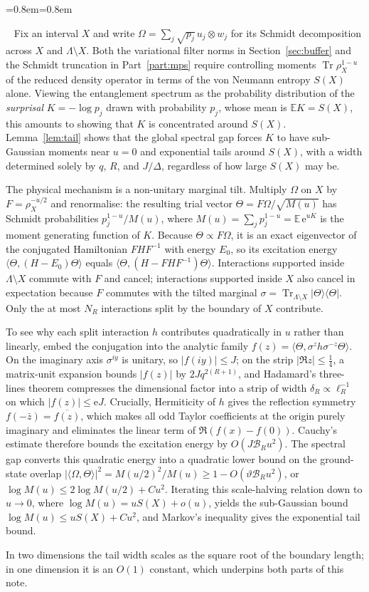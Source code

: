 \documentclass[aps,prx,reprint,superscriptaddress,floatfix,nofootinbib,longbibliography,amsmath,amssymb]{revtex4-2}
\newcommand{\E}{\mathbb E}
\newcommand{\Tr}{\operatorname{Tr}}
\newcommand{\abs}[1]{\lvert #1\rvert}
\providecommand{\ket}[1]{|#1\rangle}\renewcommand{\ket}[1]{|#1\rangle}
\providecommand{\bra}[1]{\langle #1|}\renewcommand{\bra}[1]{\langle #1|}
\newcommand{\cB}{\mathcal B}
\newcommand{\Om}{\Omega}
\newcommand{\Lam}{\Lambda}
\newcommand{\e}{\mathrm e}
\theoremstyle{plain}
\theoremstyle{definition}
\newenvironment{inwords}{%
  \par\medskip\noindent
  \begin{list}{}{\leftmargin=0.8em\rightmargin=0.8em}
  \item\relax
  \noindent{\sffamily\bfseries\color{blue!40!black}In words.}\ \sffamily\small}{%
  \end{list}\par\medskip}
\begin{document}
\begin{inwords}
Fix an interval $X$ and write $\Om=\sum_j\sqrt{p_j}\,u_j\otimes w_j$ for
its Schmidt decomposition across $X$ and $\Lam\setminus X$. Both the
variational filter norms in Section~\ref{sec:buffer} and the Schmidt
truncation in Part~\ref{part:mps} require controlling moments
$\Tr\rho_X^{1-u}$ of the reduced density operator in terms of the von
Neumann entropy $S(X)$ alone. Viewing the entanglement spectrum as the
probability distribution of the \emph{surprisal} $K=-\log p_j$ drawn with
probability $p_j$, whose mean is $\E K=S(X)$, this amounts to showing that
$K$ is concentrated around $S(X)$. Lemma~\ref{lem:tail} shows that the
global spectral gap forces $K$ to have sub-Gaussian moments near $u=0$ and
exponential tails around $S(X)$, with a width determined solely by $q$,
$R$, and $J/\Delta$, regardless of how large $S(X)$ may be.

The physical mechanism is a non-unitary marginal tilt. Multiply $\Om$ on
$X$ by $F=\rho_X^{-u/2}$ and renormalise: the resulting trial vector
$\Theta=F\Om/\sqrt{M(u)}$ has Schmidt probabilities $p_j^{1-u}/M(u)$, where
$M(u)=\sum_jp_j^{1-u}=\E\,\e^{uK}$ is the moment generating function of
$K$. Because $\Theta\propto F\Om$, it is an exact eigenvector of the
conjugated Hamiltonian $FHF^{-1}$ with energy $E_0$, so its excitation
energy $\langle\Theta,(H-E_0)\Theta\rangle$ equals
$\langle\Theta,(H-FHF^{-1})\Theta\rangle$. Interactions supported inside
$\Lam\setminus X$ commute with $F$ and cancel; interactions supported
inside $X$ also cancel in expectation because $F$ commutes with the tilted
marginal $\sigma=\Tr_{\Lam\setminus X}\ket\Theta\bra\Theta$. Only the at
most $N_R$ interactions split by the boundary of $X$ contribute.

To see why each split interaction $h$ contributes quadratically in $u$
rather than linearly, embed the conjugation into the analytic family
$f(z)=\langle\Theta,\sigma^{z}h\sigma^{-z}\Theta\rangle$. On the imaginary
axis $\sigma^{iy}$ is unitary, so $\abs{f(iy)}\le J$; on the strip
$\abs{\Re z}\le\frac14$, a matrix-unit expansion bounds $\abs{f(z)}$ by
$2Jq^{2(R+1)}$, and Hadamard's three-lines theorem compresses the
dimensional factor into a strip of width $\delta_R\propto\ell_R^{-1}$ on
which $\abs{f(z)}\le\e J$. Crucially, Hermiticity of $h$ gives the
reflection symmetry $f(-\bar z)=\overline{f(z)}$, which makes all odd
Taylor coefficients at the origin purely imaginary and eliminates the
linear term of $\Re(f(x)-f(0))$. Cauchy's estimate therefore bounds the
excitation energy by $O(J\cB_R u^2)$. The spectral gap converts this
quadratic energy into a quadratic lower bound on the ground-state overlap
$\abs{\langle\Om,\Theta\rangle}^2=M(u/2)^2/M(u)\ge 1-O(\vartheta\cB_R u^2)$,
or $\log M(u)\le 2\log M(u/2)+Cu^2$. Iterating this scale-halving relation
down to $u\to0$, where $\log M(u)=uS(X)+o(u)$, yields the sub-Gaussian
bound $\log M(u)\le uS(X)+Cu^2$, and Markov's inequality gives the
exponential tail bound.

In two dimensions the tail width scales as the square root of the boundary
length; in one dimension it is an $O(1)$ constant, which underpins both
parts of this note.
\end{inwords}
\end{document}
